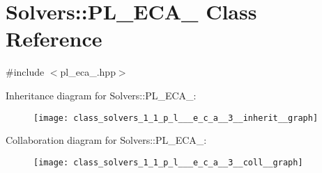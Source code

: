 \hypertarget{class_solvers_1_1_p_l___e_c_a__3}{}\section{Solvers\+:\+:P\+L\+\_\+\+E\+C\+A\+\_ Class Reference}
\label{class_solvers_1_1_p_l___e_c_a__3}


{\ttfamily \#include $<$pl\+\_\+eca\+\_.\+hpp$>$}



Inheritance diagram for Solvers\+:\+:P\+L\+\_\+\+E\+C\+A\+\_\+:\nopagebreak
\begin{figure}[H]
\begin{center}
\leavevmode
\texttt{[image: class\_solvers\_1\_1\_p\_l\_\_\_e\_c\_a\_\_3\_\_inherit\_\_graph]}
\end{center}
\end{figure}


Collaboration diagram for Solvers\+:\+:P\+L\+\_\+\+E\+C\+A\+\_\+:\nopagebreak
\begin{figure}[H]
\begin{center}
\leavevmode
\texttt{[image: class\_solvers\_1\_1\_p\_l\_\_\_e\_c\_a\_\_3\_\_coll\_\_graph]}
\end{center}
\end{figure}
